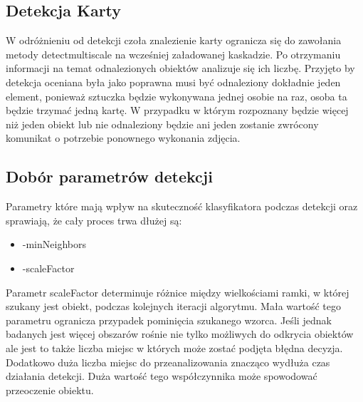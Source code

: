 \subsection{Detekcja Karty}

W odróżnieniu od detekcji czoła znalezienie karty ogranicza się do zawołania metody detectmultiscale na wcześniej załadowanej kaskadzie. Po otrzymaniu informacji na temat odnalezionych obiektów analizuje się ich liczbę. Przyjęto by detekcja oceniana była jako poprawna musi być odnaleziony dokładnie jeden element, ponieważ sztuczka będzie wykonywana jednej osobie na raz, osoba ta będzie trzymać jedną kartę. W przypadku w którym rozpoznany będzie więcej niż jeden obiekt lub nie odnaleziony będzie ani jeden zostanie zwrócony komunikat o potrzebie ponownego wykonania zdjęcia.

\subsection{Dobór parametrów detekcji}

Parametry które mają wpływ na skuteczność klasyfikatora podczas detekcji oraz sprawiają, że cały proces trwa dłużej są:
\begin{itemize}
    \item -minNeighbors
    \item -scaleFactor
\end{itemize}

Parametr scaleFactor determinuje różnice między wielkościami ramki, w której szukany jest obiekt, podczas kolejnych iteracji algorytmu. Mała wartość tego parametru ogranicza przypadek pominięcia szukanego wzorca. Jeśli jednak badanych jest więcej obszarów rośnie nie tylko możliwych do odkrycia obiektów ale jest to także liczba miejsc w których może zostać podjęta błędna decyzja. Dodatkowo duża liczba miejsc do przeanalizowania znacząco wydłuża czas działania detekcji. Duża wartość tego współczynnika może spowodować przeoczenie obiektu.


